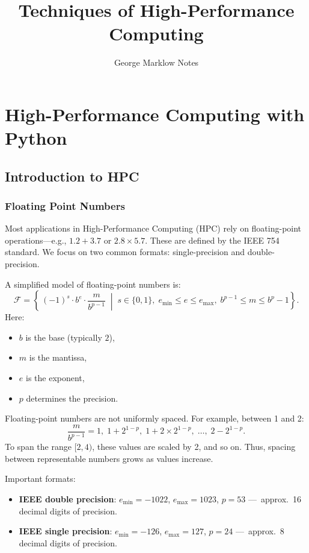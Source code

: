 \documentclass{book}
\title{Techniques of High-Performance Computing}
\author{George Marklow Notes}
\date{}
\begin{document}
\maketitle

\part{High-Performance Computing with Python}

\chapter{Introduction to HPC}

\section{Floating Point Numbers}
Most applications in High-Performance Computing (HPC) rely on floating-point operations—e.g., \(1.2 + 3.7\) or \(2.8 \times 5.7\). These are defined by the IEEE 754 standard. We focus on two common formats: single-precision and double-precision.

A simplified model of floating-point numbers is:
\[
\mathcal{F} = \left\{\,(-1)^s \cdot b^e \cdot \frac{m}{b^{p-1}} \;\middle|\; s\in\{0,1\},\; e_{\min}\le e\le e_{\max},\; b^{p-1}\le m\le b^p-1\right\}.
\]
Here:
\begin{itemize}
  \item \(b\) is the base (typically \(2\)),
  \item \(m\) is the mantissa,
  \item \(e\) is the exponent,
  \item \(p\) determines the precision.
\end{itemize}

Floating-point numbers are not uniformly spaced. For example, between 1 and 2:
\[
\frac{m}{b^{p-1}} = 1,\; 1 + 2^{1-p},\; 1 + 2\times 2^{1-p},\;\dots,\; 2 - 2^{1-p}.
\]
To span the range \([2,4)\), these values are scaled by 2, and so on. Thus, spacing between representable numbers grows as values increase.

Important formats:
\begin{itemize}
  \item \textbf{IEEE double precision}: \(e_{\min} = -1022\), \(e_{\max} = 1023\), \(p = 53\) —~approx.~16 decimal digits of precision.
  \item \textbf{IEEE single precision}: \(e_{\min} = -126\), \(e_{\max} = 127\), \(p = 24\) —~approx.~8 decimal digits of precision.
\end{itemize}
\end{document}
